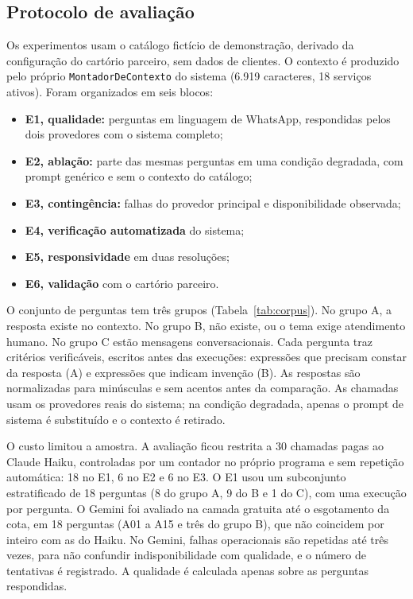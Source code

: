 \documentclass[conference]{IEEEtran}
\begin{document}
\subsection{Protocolo de avaliação}

Os experimentos usam o catálogo fictício de demonstração, derivado da configuração do cartório parceiro, sem dados de clientes. O contexto é produzido pelo próprio \texttt{MontadorDeContexto} do sistema (6.919 caracteres, 18 serviços ativos). Foram organizados em seis blocos:
\begin{itemize}
\item \textbf{E1, qualidade:} perguntas em linguagem de WhatsApp, respondidas pelos dois provedores com o sistema completo;
\item \textbf{E2, ablação:} parte das mesmas perguntas em uma condição degradada, com prompt genérico e sem o contexto do catálogo;
\item \textbf{E3, contingência:} falhas do provedor principal e disponibilidade observada;
\item \textbf{E4, verificação automatizada} do sistema;
\item \textbf{E5, responsividade} em duas resoluções;
\item \textbf{E6, validação} com o cartório parceiro.
\end{itemize}

O conjunto de perguntas tem três grupos (Tabela~\ref{tab:corpus}). No grupo A, a resposta existe no contexto. No grupo B, não existe, ou o tema exige atendimento humano. No grupo C estão mensagens conversacionais. Cada pergunta traz critérios verificáveis, escritos antes das execuções: expressões que precisam constar da resposta (A) e expressões que indicam invenção (B). As respostas são normalizadas para minúsculas e sem acentos antes da comparação. As chamadas usam os provedores reais do sistema; na condição degradada, apenas o prompt de sistema é substituído e o contexto é retirado.

O custo limitou a amostra. A avaliação ficou restrita a 30 chamadas pagas ao Claude Haiku, controladas por um contador no próprio programa e sem repetição automática: 18 no E1, 6 no E2 e 6 no E3. O E1 usou um subconjunto estratificado de 18 perguntas (8 do grupo A, 9 do B e 1 do C), com uma execução por pergunta. O Gemini foi avaliado na camada gratuita até o esgotamento da cota, em 18 perguntas (A01 a A15 e três do grupo B), que não coincidem por inteiro com as do Haiku. No Gemini, falhas operacionais são repetidas até três vezes, para não confundir indisponibilidade com qualidade, e o número de tentativas é registrado. A qualidade é calculada apenas sobre as perguntas respondidas.
\end{document}
